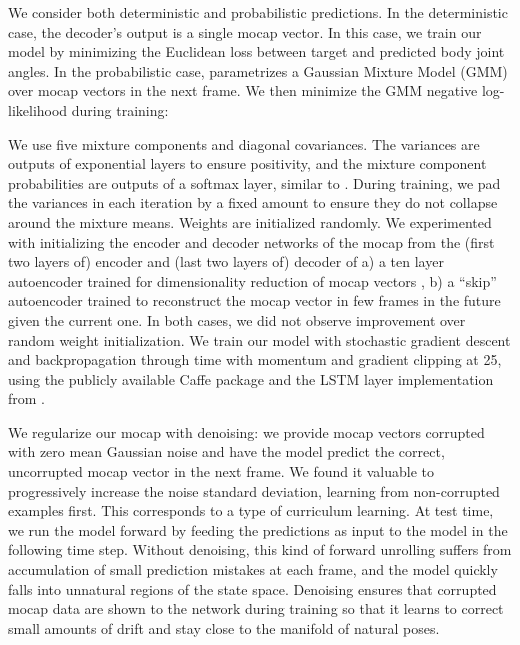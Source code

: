 \documentclass[10pt,twocolumn,letterpaper]{article}
\begin{document}
We consider both deterministic and probabilistic predictions. In the deterministic case, the decoder's output  is a single mocap vector.  In this case, we train our model by minimizing the Euclidean loss between target and predicted body joint angles. In the probabilistic case,   parametrizes  a Gaussian Mixture Model (GMM) over mocap vectors in the next frame.  We then  minimize the GMM negative log-likelihood during training:

We use five mixture components and diagonal covariances. The variances are outputs of  exponential layers to ensure  positivity, and the mixture component probabilities are outputs of a softmax layer, similar to \cite{DBLP:journals/corr/Graves13}. During training, we  pad the variances in each iteration by a fixed amount to ensure they do not collapse around the mixture means.
Weights are initialized randomly. We experimented with initializing the encoder and decoder networks of the mocap  from the (first two layers of) encoder and (last two layers of) decoder of a) a ten layer autoencoder trained for dimensionality reduction of mocap  vectors \cite{citeulike:778023}, 
  b) a ``skip'' autoencoder  trained to reconstruct the  mocap vector in few frames in the future given the current one. In both cases, we did not observe improvement over random weight initialization.  We train our  model with stochastic gradient descent and backpropagation through time \cite{Williams95gradient-basedlearning} with momentum and gradient clipping at 25, using the publicly available Caffe package \cite{Jia13caffe} and the LSTM layer  implementation from \cite{DBLP:journals/corr/DonahueHGRVSD14}. 
  







We regularize  our mocap  with denoising: we provide   mocap vectors corrupted with zero mean Gaussian noise \cite{Vincent:2010:SDA:1756006.1953039} and have the model  predict the correct, uncorrupted  mocap vector in the next frame. We found it valuable to progressively increase the noise standard deviation, learning from non-corrupted  examples first. This corresponds to a type of curriculum learning. At test time, we  run the model forward by feeding the predictions as input to the model in the following time step. Without  denoising, this kind of forward unrolling  suffers from accumulation of small prediction mistakes at each frame, and the model  
quickly falls into unnatural regions of the state space. 
Denoising ensures that corrupted mocap data are shown to the network during training so that it learns to  correct small amounts of drift and stay close to the manifold of natural poses.
\end{document}
